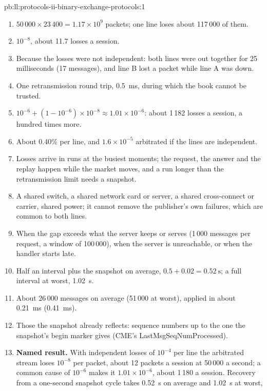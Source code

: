 \begin{solution}{pb:ll:protocols-ii-binary-exchange-protocols:1}
\begin{enumerate}
\item $50\,000 \times 23\,400 = 1.17 \times 10^9$ packets; one line loses about 117\,000 of them.
\item $10^{-8}$, about 11.7 losses a session.
\item Because the losses were not independent: both lines were out together for 25 milliseconds (17 messages), and line B lost a
packet while line A was down.
\item One retransmission round trip, \qty{0.5}{\milli\second}, during which the book cannot be trusted.
\item $10^{-6} + (1 - 10^{-6}) \times 10^{-8} \approx 1.01 \times 10^{-6}$: about 1\,182 losses a session, a hundred times more.
\item About 0.40\% per line, and $1.6 \times 10^{-5}$ arbitrated if the lines are independent.
\item Losses arrive in runs at the busiest moments; the request, the answer and the replay happen while the market moves, and a
run longer than the retransmission limit needs a snapshot.
\item A shared switch, a shared network card or server, a shared cross-connect or carrier, shared power; it cannot remove the
publisher's own failures, which are common to both lines.
\item When the gap exceeds what the server keeps or serves (1\,000 messages per request, a window of 100\,000), when the
server is unreachable, or when the handler starts late.
\item Half an interval plus the snapshot on average, $0.5 + 0.02 = \qty{0.52}{\second}$; a full interval at worst,
\qty{1.02}{\second}.
\item About 26\,000 messages on average (51\,000 at worst), applied in about \qty{0.21}{\milli\second} (\qty{0.41}{\milli\second}).
\item Those the snapshot already reflects: sequence numbers up to the one the snapshot's begin marker gives (CME's
LastMsgSeqNumProcessed).
\item \textbf{Named result.} With independent losses of $10^{-4}$ per line the arbitrated stream loses $10^{-8}$ per packet,
about 12 packets a session at 50\,000 a second; a common cause of $10^{-6}$ makes it $1.01 \times 10^{-6}$, about 1\,180 a
session. Recovery from a one-second snapshot cycle takes \qty{0.52}{\second} on average and \qty{1.02}{\second} at worst,

\end{enumerate}
\end{solution}

